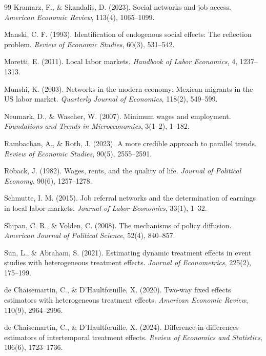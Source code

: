 \documentclass[12pt]{article}
\begin{document}
\begin{thebibliography}{99}
Kramarz, F., \& Skandalis, D. (2023).
Social networks and job access.
\textit{American Economic Review}, 113(4), 1065--1099.

Manski, C. F. (1993).
Identification of endogenous social effects: The reflection problem.
\textit{Review of Economic Studies}, 60(3), 531--542.

Moretti, E. (2011).
Local labor markets.
\textit{Handbook of Labor Economics}, 4, 1237--1313.

Munshi, K. (2003).
Networks in the modern economy: Mexican migrants in the US labor market.
\textit{Quarterly Journal of Economics}, 118(2), 549--599.

Neumark, D., \& Wascher, W. (2007).
Minimum wages and employment.
\textit{Foundations and Trends in Microeconomics}, 3(1--2), 1--182.

Rambachan, A., \& Roth, J. (2023).
A more credible approach to parallel trends.
\textit{Review of Economic Studies}, 90(5), 2555--2591.

Roback, J. (1982).
Wages, rents, and the quality of life.
\textit{Journal of Political Economy}, 90(6), 1257--1278.

Schmutte, I. M. (2015).
Job referral networks and the determination of earnings in local labor markets.
\textit{Journal of Labor Economics}, 33(1), 1--32.

Shipan, C. R., \& Volden, C. (2008).
The mechanisms of policy diffusion.
\textit{American Journal of Political Science}, 52(4), 840--857.

Sun, L., \& Abraham, S. (2021).
Estimating dynamic treatment effects in event studies with heterogeneous treatment effects.
\textit{Journal of Econometrics}, 225(2), 175--199.

de Chaisemartin, C., \& D'Haultf{\oe}uille, X. (2020).
Two-way fixed effects estimators with heterogeneous treatment effects.
\textit{American Economic Review}, 110(9), 2964--2996.

de Chaisemartin, C., \& D'Haultf{\oe}uille, X. (2024).
Difference-in-differences estimators of intertemporal treatment effects.
\textit{Review of Economics and Statistics}, 106(6), 1723--1736.


\end{thebibliography}
\end{document}
